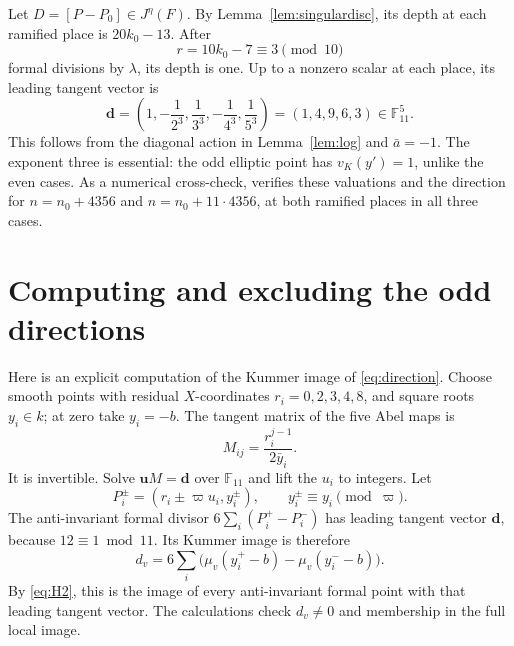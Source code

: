 \documentclass[11pt]{article}
\newcommand{\F}{\mathbb F}\newcommand{\OO}{\mathcal O}
\begin{document}
Let \(D=[P-P_0]\in J^\eta(F)\). By
Lemma~\ref{lem:singulardisc}, its depth at each ramified place is
\(20k_0-13\). After
\begin{equation}\label{eq:divisions}
 r=10k_0-7\equiv3\pmod{10}
\end{equation}
formal divisions by \(\lambda\), its depth is one. Up to a nonzero
scalar at each place, its leading tangent vector is
\begin{equation}\label{eq:direction}
 \mathbf d=
 \left(1,-\frac1{2^3},\frac1{3^3},-\frac1{4^3},\frac1{5^3}\right)
 =(1,4,9,6,3)\in\F_{11}^5.
\end{equation}
This follows from the diagonal action in Lemma~\ref{lem:log} and
\(\bar a=-1\). The exponent three is essential: the odd elliptic
point has \(v_K(y')=1\), unlike the even cases.
As a numerical cross-check,  verifies
these valuations and the direction for \(n=n_0+4356\) and
\(n=n_0+11\cdot4356\), at both ramified places in all three cases.

\section{Computing and excluding the odd directions}
Here is an explicit computation of the Kummer image of
\eqref{eq:direction}. Choose smooth points with residual
\(X\)-coordinates \(r_i=0,2,3,4,8\), and square roots \(y_i\in k\);
at zero take \(y_i=-b\). The tangent matrix of the five Abel maps is
\[
 M_{ij}=\frac{r_i^{j-1}}{2\bar y_i}.
\]
It is invertible. Solve \(\mathbf uM=\mathbf d\) over \(\F_{11}\)
and lift the \(u_i\) to integers. Let
\[
 P_i^\pm=(r_i\pm\varpi u_i,y_i^\pm),
 \qquad y_i^\pm\equiv y_i\pmod\varpi.
\]
The anti-invariant formal divisor
\(6\sum_i(P_i^+-P_i^-)\) has leading tangent vector \(\mathbf d\),
because \(12\equiv1\bmod11\). Its Kummer image is therefore
\begin{equation}\label{eq:muformula}
 d_v=6\sum_i\bigl(\mu_v(y_i^+-b)-\mu_v(y_i^--b)\bigr).
\end{equation}
By \eqref{eq:H2}, this is the image of every anti-invariant formal
point with that leading tangent vector. The calculations check
\(d_v\ne0\) and membership in the full local image.
\end{document}
